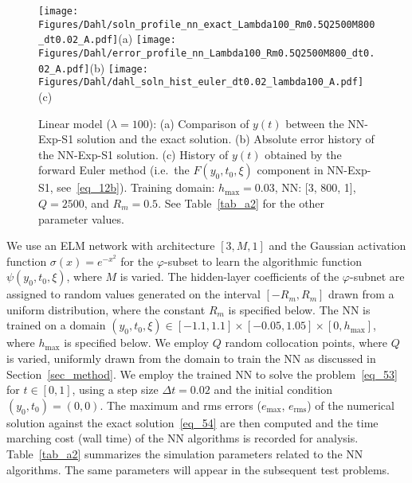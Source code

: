 \begin{figure}
  \centerline{
    \texttt{[image: Figures/Dahl/soln\_profile\_nn\_exact\_Lambda100\_Rm0.5Q2500M800\_dt0.02\_A.pdf]}(a)
    \texttt{[image: Figures/Dahl/error\_profile\_nn\_Lambda100\_Rm0.5Q2500M800\_dt0.02\_A.pdf]}(b)
    \texttt{[image: Figures/Dahl/dahl\_soln\_hist\_euler\_dt0.02\_lambda100\_A.pdf]}(c)
  }
  \caption{Linear model ($\lambda=100$):
    (a) Comparison of $y(t)$ between the NN-Exp-S1 solution and the exact solution.
    (b) Absolute error history of  the NN-Exp-S1 solution.
    (c) History of $y(t)$ obtained by the forward Euler method
    (i.e.~the $F(y_0,t_0,\xi)$ component in NN-Exp-S1, see~\eqref{eq_12b}).
    Training domain: $h_{\max}=0.03$,
    NN: [3, 800, 1], %
    $Q=2500$, and $R_m=0.5$. See Table~\ref{tab_a2} for the other parameter values.
  }
  \label{fg_3}
\end{figure}



We use an ELM network with architecture $[3,M,1]$
and the Gaussian activation function
$\sigma(x)=e^{-x^2}$ for the $\varphi$-subset
 to learn the  algorithmic function $\psi(y_0,t_0,\xi)$,
where $M$ is varied. The hidden-layer coefficients of the $\varphi$-subnet are
assigned to random values generated on the interval $[-R_m,R_m]$ drawn from
a uniform distribution, where the constant $R_m$ is specified below.
The NN is trained on a domain
$(y_0,t_0,\xi)\in[-1.1,1.1]\times[-0.05,1.05]\times[0,h_{\max}]$, where $h_{\max}$
is specified below. We employ $Q$ random collocation points,
where $Q$ is  varied,
uniformly drawn from the domain to train the NN  as discussed in
Section~\ref{sec_method}.
We employ the trained NN
to solve the problem~\eqref{eq_53}  for $t\in[0,1]$,
using a step size $\Delta t=0.02$ and the initial condition $(y_0,t_0)=(0,0)$.
The maximum and rms errors ($e_{\max}$, $e_{\text{rms}}$) of the numerical
solution against the exact solution~\eqref{eq_54} are then computed and
the time marching cost (wall time) of the NN algorithms is recorded for analysis.
Table~\ref{tab_a2} summarizes the simulation parameters related to the NN algorithms.
The same parameters will appear in the subsequent
test problems.



